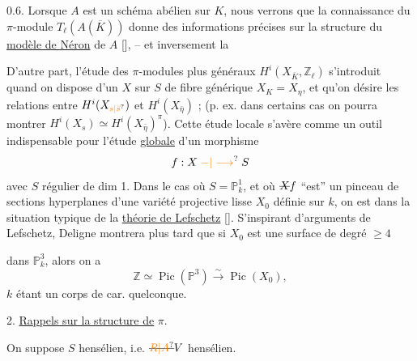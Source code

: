 0.6. Lorsque \(A\) est un schéma abélien sur \(K\), nous verrons que la connaissance du \(\pi\)-module \(T_\ell(A(\overline K))\) donne des informations  précises sur la structure du \uline{modèle de Néron} de \(A\) [\quad], -- et inversement la 

D'autre part, l'étude des \(\pi\)-modules plus généraux \(H^i(X_{\overline K},\mathbb Z_\ell)\) s'introduit quand on  dispose d'un   \(X\)  sur \(S\) de fibre générique \(X_K=X_\eta\), et qu'on désire  les relations entre  \(H^i(X_{\unsure{s|\bar s}})\) et \(H^i(X_{\bar\eta})\) ; (p. ex. dans certains cas on pourra montrer \(H^i(X_s)\simeq H^i(X_{\bar\eta})^\pi\)). Cette  étude locale s'avère comme un outil indispensable pour l'étude  \uline{globale} d'un morphisme
\[
f:X\mathrel{\unsure{-|\longrightarrow}}S
\]
avec \(S\) régulier de dim 1.  Dans le cas où \(S=\mathbb P^1_k\), et où \(\deleted{X}f\) ``est''  un pinceau  de sections hyperplanes d'une variété projective lisse \(X_0\) définie sur \(k\), on est dans la situation typique de la \uline{théorie de Lefschetz} [\quad]. S'inspirant d'arguments de Lefschetz, Deligne montrera plus tard que si \(X_0\) est une surface de degré \(\geq4\)

dans \(\mathbb P^3_k\), alors on a
\[
\mathbb Z\simeq\operatorname{Pic}(\mathbb P^3)\xrightarrow{\sim}\operatorname{Pic}(X_0),
\]
\(k\) étant un corps de car. quelconque.

2. \uline{Rappels sur la structure de} \(\pi\).

On suppose \(S\) hensélien, i.e. \(\deleted{\unsure{R|A}}V\) hensélien.

